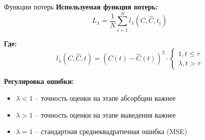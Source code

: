 \documentclass[12pt]{beamer}
\begin{document}
\begin{frame}{Функции потерь}
	\textbf{Используемая функция потерь:}
	\[ L_{\lambda} = \frac{1}{N} \sum_{i=1}^{N} l_{\lambda}(C, \hat{C}, t_i) \]

	\textbf{Где:}
	\[ l_{\lambda}(C, \hat{C}, t) = (C(t) - \hat{C}(t)) ^ 2 \cdot \begin{cases}
			1, t \leq \tau \\
			\lambda, t > \tau
		\end{cases} \]

	\textbf{Регулировка ошибки:}
	\begin{itemize}
		\item $\lambda < 1$ – точность оценки на этапе абсорбции важнее
		\item $\lambda > 1$ – точность оценки на этапе выведения важнее
		\item $\lambda = 1$ – стандартная среднеквадратичная ошибка (MSE)
	\end{itemize}
\end{frame}
\end{document}
